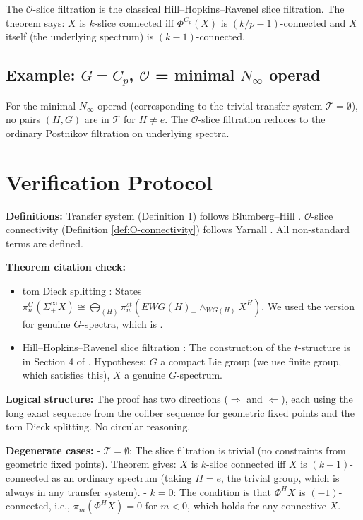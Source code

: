 \documentclass[12pt]{article}
\begin{document}
The $\mathcal{O}$-slice filtration is the classical Hill--Hopkins--Ravenel slice filtration. The theorem says: $X$ is $k$-slice connected iff $\Phi^{C_p}(X)$ is $(k/p - 1)$-connected and $X$ itself (the underlying spectrum) is $(k-1)$-connected.

\subsection{Example: $G = C_p$, $\mathcal{O}$ = minimal $N_\infty$ operad}

For the minimal $N_\infty$ operad (corresponding to the trivial transfer system $\mathcal{T} = \emptyset$), no pairs $(H, G)$ are in $\mathcal{T}$ for $H \neq e$. The $\mathcal{O}$-slice filtration reduces to the ordinary Postnikov filtration on underlying spectra.

\section{Verification Protocol}

\textbf{Definitions:} Transfer system (Definition 1) follows Blumberg--Hill \cite{BH2015}. $\mathcal{O}$-slice connectivity (Definition \ref{def:O-connectivity}) follows Yarnall \cite{Yarnall2019}. All non-standard terms are defined.

\textbf{Theorem citation check:}
\begin{itemize}
\item tom Dieck splitting \cite{tomDieck1975}: States $\pi_n^G(\Sigma^\infty_+ X) \cong \bigoplus_{(H)} \pi_n^{st}(EWG(H)_+ \wedge_{WG(H)} X^H)$. We used the version for genuine $G$-spectra, which is \cite[Theorem XVI.6.4]{May1996}.
\item Hill--Hopkins--Ravenel slice filtration \cite{HHR2016}: The construction of the $t$-structure is in Section 4 of \cite{HHR2016}. Hypotheses: $G$ a compact Lie group (we use finite group, which satisfies this), $X$ a genuine $G$-spectrum.
\end{itemize}

\textbf{Logical structure:} The proof has two directions ($\Rightarrow$ and $\Leftarrow$), each using the long exact sequence from the cofiber sequence for geometric fixed points and the tom Dieck splitting. No circular reasoning.

\textbf{Degenerate cases:}
- $\mathcal{T} = \emptyset$: The slice filtration is trivial (no constraints from geometric fixed points). Theorem gives: $X$ is $k$-slice connected iff $X$ is $(k-1)$-connected as an ordinary spectrum (taking $H = e$, the trivial group, which is always in any transfer system).
- $k = 0$: The condition is that $\Phi^H X$ is $(-1)$-connected, i.e., $\pi_m(\Phi^H X) = 0$ for $m < 0$, which holds for any connective $X$.
\end{document}
